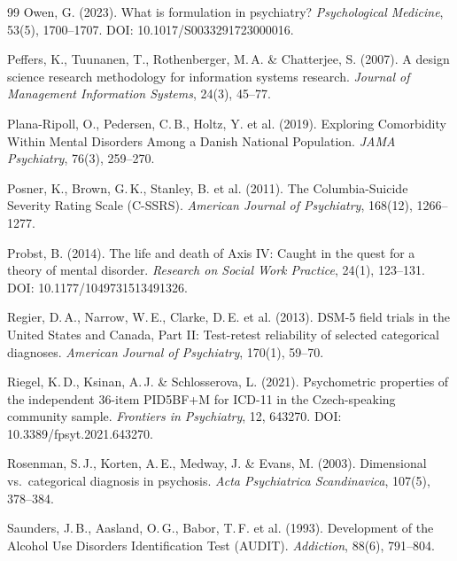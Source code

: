 \documentclass[11pt,a4paper]{article}
\begin{document}
\begin{thebibliography}{99}
Owen, G. (2023).
\newblock What is formulation in psychiatry?
\newblock \textit{Psychological Medicine}, 53(5), 1700--1707. DOI: 10.1017/S0033291723000016.

Peffers, K., Tuunanen, T., Rothenberger, M.\,A. \& Chatterjee, S. (2007).
\newblock A design science research methodology for information systems research.
\newblock \textit{Journal of Management Information Systems}, 24(3), 45--77.

Plana-Ripoll, O., Pedersen, C.\,B., Holtz, Y. et al. (2019).
\newblock Exploring Comorbidity Within Mental Disorders Among a Danish National Population.
\newblock \textit{JAMA Psychiatry}, 76(3), 259--270.

Posner, K., Brown, G.\,K., Stanley, B. et al. (2011).
\newblock The Columbia-Suicide Severity Rating Scale (C-SSRS).
\newblock \textit{American Journal of Psychiatry}, 168(12), 1266--1277.

Probst, B. (2014).
\newblock The life and death of Axis IV: Caught in the quest for a theory of mental disorder.
\newblock \textit{Research on Social Work Practice}, 24(1), 123--131. DOI: 10.1177/1049731513491326.

Regier, D.\,A., Narrow, W.\,E., Clarke, D.\,E. et al. (2013).
\newblock DSM-5 field trials in the United States and Canada, Part II: Test-retest reliability of selected categorical diagnoses.
\newblock \textit{American Journal of Psychiatry}, 170(1), 59--70.

Riegel, K.\,D., Ksinan, A.\,J. \& Schlosserova, L. (2021).
\newblock Psychometric properties of the independent 36-item PID5BF+M for ICD-11 in the Czech-speaking community sample.
\newblock \textit{Frontiers in Psychiatry}, 12, 643270. DOI: 10.3389/fpsyt.2021.643270.

Rosenman, S.\,J., Korten, A.\,E., Medway, J. \& Evans, M. (2003).
\newblock Dimensional vs.\ categorical diagnosis in psychosis.
\newblock \textit{Acta Psychiatrica Scandinavica}, 107(5), 378--384.

Saunders, J.\,B., Aasland, O.\,G., Babor, T.\,F. et al. (1993).
\newblock Development of the Alcohol Use Disorders Identification Test (AUDIT).
\newblock \textit{Addiction}, 88(6), 791--804.


\end{thebibliography}
\end{document}
